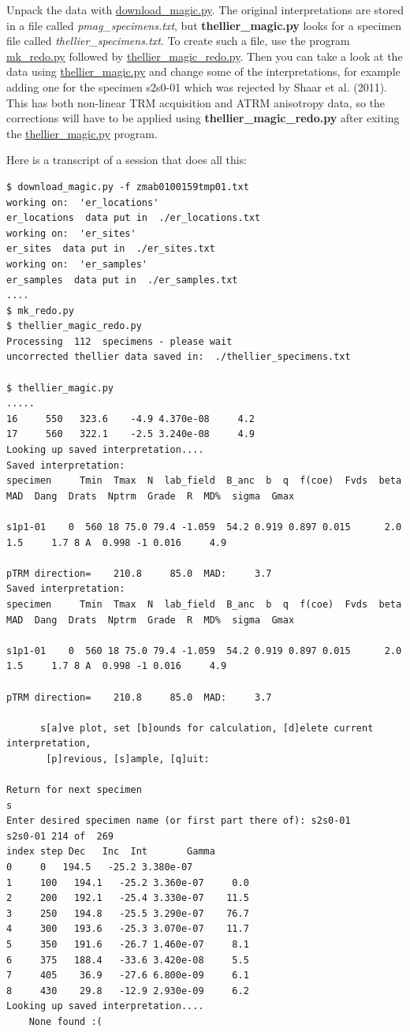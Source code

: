 \documentclass[11pt]{book}
\begin{document}
{Unpack the data with \href{#download_magic.py}{download\_magic.py}.   The original interpretations are stored in a file called {\it pmag\_specimens.txt}, but {\bf thellier\_magic.py} looks for a specimen file called {\it thellier\_specimens.txt}.  To create such a file, use the program \href{#mk_redo.py}{mk\_redo.py} followed by \href{#thellier_magic_redo.py}{thellier\_magic\_redo.py}.  Then you can take a look  at the data using \href{#thellier_magic.py}{thellier\_magic.py} and change some of the interpretations, for example adding one for the specimen s2s0-01 which was rejected by Shaar et al. (2011).   This has both non-linear TRM acquisition and ATRM anisotropy data, so the corrections will have to be applied using {\bf thellier\_magic\_redo.py} after exiting the \href{thellier_magic.py}{thellier\_magic.py} program.

Here is a transcript of a session that does all this:

\begin{verbatim}
$ download_magic.py -f zmab0100159tmp01.txt
working on:  'er_locations'
er_locations  data put in  ./er_locations.txt
working on:  'er_sites'
er_sites  data put in  ./er_sites.txt
working on:  'er_samples'
er_samples  data put in  ./er_samples.txt
....
$ mk_redo.py
$ thellier_magic_redo.py
Processing  112  specimens - please wait
uncorrected thellier data saved in:  ./thellier_specimens.txt

$ thellier_magic.py
.....
16     550   323.6    -4.9 4.370e-08     4.2
17     560   322.1    -2.5 3.240e-08     4.9
Looking up saved interpretation....
Saved interpretation:
specimen     Tmin  Tmax  N  lab_field  B_anc  b  q  f(coe)  Fvds  beta  MAD  Dang  Drats  Nptrm  Grade  R  MD%  sigma  Gmax

s1p1-01    0  560 18 75.0 79.4 -1.059  54.2 0.919 0.897 0.015      2.0     1.5     1.7 8 A  0.998 -1 0.016     4.9

pTRM direction=    210.8     85.0  MAD:     3.7
Saved interpretation:
specimen     Tmin  Tmax  N  lab_field  B_anc  b  q  f(coe)  Fvds  beta  MAD  Dang  Drats  Nptrm  Grade  R  MD%  sigma  Gmax

s1p1-01    0  560 18 75.0 79.4 -1.059  54.2 0.919 0.897 0.015      2.0     1.5     1.7 8 A  0.998 -1 0.016     4.9

pTRM direction=    210.8     85.0  MAD:     3.7

      s[a]ve plot, set [b]ounds for calculation, [d]elete current interpretation,
       [p]revious, [s]ample, [q]uit:

Return for next specimen
s
Enter desired specimen name (or first part there of): s2s0-01
s2s0-01 214 of  269
index step Dec   Inc  Int       Gamma
0     0   194.5   -25.2 3.380e-07
1     100   194.1   -25.2 3.360e-07     0.0
2     200   192.1   -25.4 3.330e-07    11.5
3     250   194.8   -25.5 3.290e-07    76.7
4     300   193.6   -25.3 3.070e-07    11.7
5     350   191.6   -26.7 1.460e-07     8.1
6     375   188.4   -33.6 3.420e-08     5.5
7     405    36.9   -27.6 6.800e-09     6.1
8     430    29.8   -12.9 2.930e-09     6.2
Looking up saved interpretation....
    None found :(


\end{verbatim}}
\end{document}
